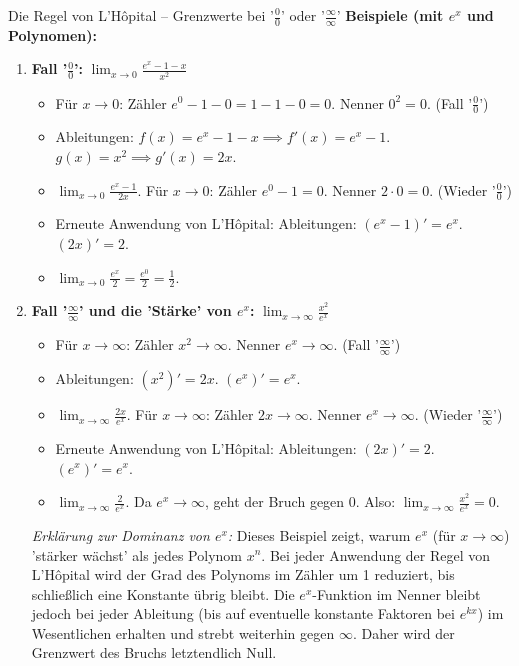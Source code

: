 \begin{infoboxumgebung}{Die Regel von L'Hôpital – Grenzwerte bei '$\frac{0}{0}$' oder '$\frac{\infty}{\infty}$'}
\textbf{Beispiele (mit $e^x$ und Polynomen):}
\begin{enumerate}
    \item \textbf{Fall '$\frac{0}{0}$':} $\lim_{x \to 0} \frac{e^x - 1 - x}{x^2}$
        \begin{itemize}
            \item Für $x \to 0$: Zähler $e^0 - 1 - 0 = 1-1-0=0$. Nenner $0^2=0$. (Fall '$\frac{0}{0}$')
            \item Ableitungen: $f(x) = e^x-1-x \implies f'(x) = e^x-1$. $g(x) = x^2 \implies g'(x) = 2x$.
            \item $\lim_{x \to 0} \frac{e^x-1}{2x}$. Für $x \to 0$: Zähler $e^0-1=0$. Nenner $2 \cdot 0=0$. (Wieder '$\frac{0}{0}$')
            \item Erneute Anwendung von L'Hôpital:
            Ableitungen: $(e^x-1)' = e^x$. $(2x)' = 2$.
            \item $\lim_{x \to 0} \frac{e^x}{2} = \frac{e^0}{2} = \frac{1}{2}$.
        \end{itemize}
    \item \textbf{Fall '$\frac{\infty}{\infty}$' und die 'Stärke' von $e^x$:} $\lim_{x \to \infty} \frac{x^2}{e^x}$
        \begin{itemize}
            \item Für $x \to \infty$: Zähler $x^2 \to \infty$. Nenner $e^x \to \infty$. (Fall '$\frac{\infty}{\infty}$')
            \item Ableitungen: $(x^2)' = 2x$. $(e^x)' = e^x$.
            \item $\lim_{x \to \infty} \frac{2x}{e^x}$. Für $x \to \infty$: Zähler $2x \to \infty$. Nenner $e^x \to \infty$. (Wieder '$\frac{\infty}{\infty}$')
            \item Erneute Anwendung von L'Hôpital:
            Ableitungen: $(2x)' = 2$. $(e^x)' = e^x$.
            \item $\lim_{x \to \infty} \frac{2}{e^x}$. Da $e^x \to \infty$, geht der Bruch gegen $0$. Also: $\lim_{x \to \infty} \frac{x^2}{e^x} = 0$.
        \end{itemize}
        \textit{Erklärung zur Dominanz von $e^x$:} Dieses Beispiel zeigt, warum $e^x$ (für $x \to \infty$) 'stärker wächst' als jedes Polynom $x^n$. Bei jeder Anwendung der Regel von L'Hôpital wird der Grad des Polynoms im Zähler um 1 reduziert, bis schließlich eine Konstante übrig bleibt. Die $e^x$-Funktion im Nenner bleibt jedoch bei jeder Ableitung (bis auf eventuelle konstante Faktoren bei $e^{kx}$) im Wesentlichen erhalten und strebt weiterhin gegen $\infty$. Daher wird der Grenzwert des Bruchs letztendlich Null.


\end{enumerate}
\end{infoboxumgebung}
